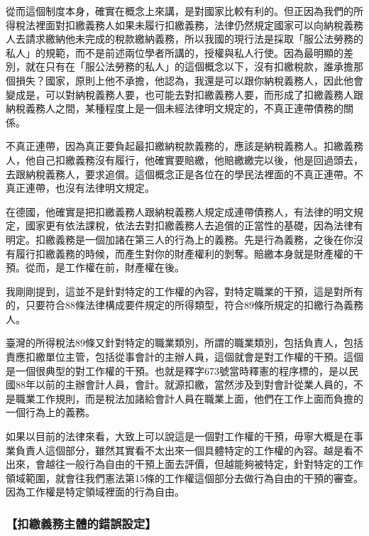 \documentclass[oneside,sub3section]{ctexbook}
\begin{document}
從而這個制度本身，確實在概念上來講，是對國家比較有利的。但正因為我們的所得稅法裡面對扣繳義務人如果未履行扣繳義務，法律仍然規定國家可以向納稅義務人去請求繳納他未完成的稅款繳納義務，所以我國的現行法是採取「服公法勞務的私人」的規範，而不是前述兩位學者所講的，授權與私人行使。因為最明顯的差別，就在只有在「服公法勞務的私人」的這個概念以下，沒有扣繳稅款，誰承擔那個損失？國家，原則上他不承擔，他認為，我還是可以跟你納稅義務人，因此他會變成是，可以對納稅義務人要，也可能去對扣繳義務人要，而形成了扣繳義務人跟納稅義務人之間，某種程度上是一個未經法律明文規定的，不真正連帶債務的關係。

不真正連帶，因為真正要負起最扣繳納稅款義務的，應該是納稅義務人。扣繳義務人，他自己扣繳義務沒有履行，他確實要賠繳，他賠繳繳完以後，他是回過頭去，去跟納稅義務人，要求追償。這個概念正是各位在的學民法裡面的不真正連帶。不真正連帶，也沒有法律明文規定。

在德國，他確實是把扣繳義務人跟納稅義務人規定成連帶債務人，有法律的明文規定，國家更有依法課稅，依法去對扣繳義務人去追償的正當性的基礎，因為法律有明定。扣繳義務是一個加諸在第三人的行為上的義務。先是行為義務，之後在你沒有履行扣繳義務的時候，而產生對你的財產權利的剝奪。賠繳本身就是財產權的干預。從而，是工作權在前，財產權在後。

我剛剛提到，這並不是針對特定的工作權的內容，對特定職業的干預，這是對所有的，只要符合88條法律構成要件規定的所得類型，符合89條所規定的扣繳行為義務人。

臺灣的所得稅法89條又針對特定的職業類別，所謂的職業類別，包括負責人，包括責應扣繳單位主管，包括從事會計的主辦人員，這個就會是對工作權的干預。這個是一個很典型的對工作權的干預。也就是釋字673號當時釋憲的程序標的，是以民國88年以前的主辦會計人員，會計。就源扣繳，當然涉及到對會計從業人員的，不是職業工作規則，而是稅法加諸給會計人員在職業上面，他們在工作上面而負擔的一個行為上的義務。

如果以目前的法律來看，大致上可以說這是一個對工作權的干預，毋寧大概是在事業負責人這個部分，雖然其實看不太出來一個具體特定的工作權的內容。越是看不出來，會越往一般行為自由的干預上面去評價，但越能夠被特定，針對特定的工作領域範圍，就會往我們憲法第15條的工作權這個部分去做行為自由的干預的審查。因為工作權是特定領域裡面的行為自由。

\hypertarget{ux6263ux7e73ux7fa9ux52d9ux4e3bux9ad4ux7684ux932fux8aa4ux8a2dux5b9a}{%
\subsubsection{【扣繳義務主體的錯誤設定】}\label{ux6263ux7e73ux7fa9ux52d9ux4e3bux9ad4ux7684ux932fux8aa4ux8a2dux5b9a}}
\end{document}
